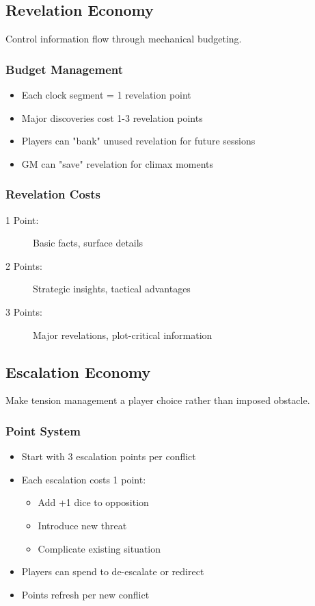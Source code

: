 \subsection{Revelation Economy}

Control information flow through mechanical budgeting.

\subsubsection{Budget Management}

\begin{itemize}
\item Each clock segment = 1 revelation point
\item Major discoveries cost 1-3 revelation points
\item Players can "bank" unused revelation for future sessions
\item GM can "save" revelation for climax moments
\end{itemize}

\subsubsection{Revelation Costs}

\begin{description}
\item[1 Point:] Basic facts, surface details
\item[2 Points:] Strategic insights, tactical advantages
\item[3 Points:] Major revelations, plot-critical information
\end{description}

\subsection{Escalation Economy}

Make tension management a player choice rather than imposed obstacle.

\subsubsection{Point System}

\begin{itemize}
\item Start with 3 escalation points per conflict
\item Each escalation costs 1 point:
  \begin{itemize}
  \item Add +1 dice to opposition
  \item Introduce new threat
  \item Complicate existing situation
  \end{itemize}
\item Players can spend to de-escalate or redirect
\item Points refresh per new conflict
\end{itemize}

